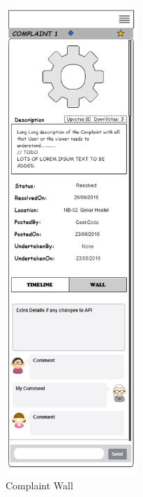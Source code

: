 \documentclass[12pt]{article}
\begin{document}
    
 \begin{figure}[H]
  \centering
  \caption{Complaint Wall}\label{fig:complaintWallScreen1}
  \includegraphics[width=5cm]{./appMockUp/complaintWallScreen1}
  \end{figure}
  
  
\end{document}
